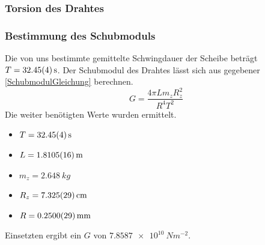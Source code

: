 \documentclass[
	a4paper,
	12pt,
	pagesize,
	ngerman
]{scrartcl}
\begin{document}
	\subsubsection{Torsion des Drahtes}
	\subsubsection*{Bestimmung des Schubmoduls}
	Die von uns bestimmte gemittelte Schwingdauer der Scheibe beträgt $T=\SI{32,45 \pm 0,04}{s}$.
	Der Schubmodul des Drahtes lässt sich aus gegebener \cref{SchubmodulGleichung} berechnen.
	\begin{equation}
		\label{SchubmodulGleichung}
		G = \frac{4\pi Lm_zR_z^2}{R^4T^2}
	\end{equation}
	Die weiter benötigten Werte wurden ermittelt. 
	\begin{itemize}
		\item $T=\SI{32,45 \pm 0,04}{s}$
		\item $L = \SI{1,8105 \pm 0,0016 }{m}$
		\item $m_z = \SI{2,648}{kg}$
		\item $R_z = \SI{7,325 \pm 0,029}{cm}$
		\item $R = \SI{0,25 \pm 0,0029}{mm}$
	\end{itemize}
	Einsetzten ergibt ein $G$ von $\SI{7,8587e10}{Nm^{-2}}$.
\end{document}
